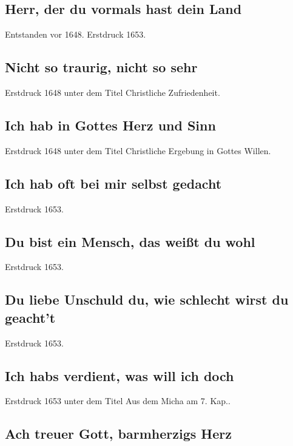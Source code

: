 \subsection*{ Herr, der du vormals hast dein Land}

Entstanden vor 1648. Erstdruck 1653.

\subsection*{ Nicht so traurig, nicht so sehr}

Erstdruck 1648 unter dem Titel \frqq Christliche Zufriedenheit\flqq .

\subsection*{ Ich hab in Gottes Herz und Sinn}

Erstdruck 1648 unter dem Titel \frqq Christliche Ergebung in Gottes Willen\flqq .

\subsection*{ Ich hab oft bei mir selbst gedacht}

Erstdruck 1653.

\subsection*{ Du bist ein Mensch, das weißt du wohl}

Erstdruck 1653.

\subsection*{ Du liebe Unschuld du, wie schlecht wirst du geacht't}

Erstdruck 1653.

\subsection*{ Ich habs verdient, was will ich doch}

Erstdruck 1653 unter dem Titel \frqq Aus dem Micha am 7. Kap.\flqq .

\subsection*{ Ach treuer Gott, barmherzigs Herz}

